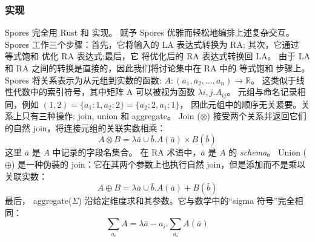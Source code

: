 
\subsubsection{实现}


Spores 完全用 Rust 和 \Egg 实现。
\Egg 赋予 Spores 优雅而轻松地编排上述复杂交互。
Spores 工作三个步骤：首先，它将输入的 LA 表达式转换为 RA;
其次，它通过 等式饱和 优化 RA 表达式;最后，它
将优化后的 RA 表达式转换回 LA。
由于 LA 和 RA 之间的转换是直接的，因此我们将讨论集中在 RA 中的 等式饱和 步骤上。
Spores 将关系表示为从元组到实数的函数: 
$A: (a_1, a_2, ..., a_n) \rightarrow \mathbb{R}$。
这类似于线性代数中的索引符号，其中矩阵 A 可以被视为函数 
$\lambda i, j . A_{ij}$。
元组与命名记录相同，例如 $(1, 2) = \{a_1: 1, a_2: 2\} = \{a_2: 2, a_1: 1\}$，
因此元组中的顺序无关紧要。关系上只有三种操作: join, union 和 aggregate。 
Join ($\otimes$) 接受两个关系并返回它们的自然 join，将连接元组的关联实数相乘：
\[ A \otimes B = \lambda \bar{a} \cup \bar{b} . A(\bar{a}) \times B(\bar{b})\]
这里 $\bar{a}$ 是 $A$ 中记录的字段名集合。
在 RA 术语中，$\bar{a}$ 是 $A$ 的 {\em schema}。
Union ($\oplus$) 是一种伪装的 join：它在其两个参数上也执行自然 join，但是添加而不是乘以关联实数：
\[A \oplus B = \lambda \bar{a} \cup \bar{b} . A(\bar{a}) + B(\bar{b})\] 
最后， aggregate($\Sigma$) 沿给定维度求和其参数。它与数学中的“sigma 符号”完全相同：
\[\sum_{a_i} A = \lambda \bar{a}-a_i . \sum_{a_i} A(\bar{a})\]

